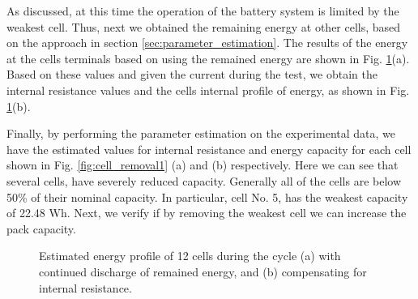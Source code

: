 \documentclass[10pt,twocolumn]{IEEEtran}
\begin{document}
As discussed, at this time the operation of the battery system is limited by the weakest cell. Thus, next we obtained the remaining energy at  other cells, based on the approach in  section \ref{sec:parameter_estimation}.
The results of the energy at the cells terminals based on using the remained energy are shown in Fig. \ref{fig:corrected_soc}(a).
Based on these values and given the current during the test,  we obtain the internal resistance values and the cells internal profile of energy, as shown in Fig. \ref{fig:corrected_soc}(b).


%


Finally, by performing  the parameter estimation on the experimental data,  we have the  estimated values for internal resistance and energy capacity for each cell shown in Fig. \ref{fig:cell_removal1} (a) and (b) respectively.
Here we can see that several cells, have severely reduced capacity. 
Generally all of the cells are below 50\%  of their nominal capacity.
In particular, cell No. 5, has the weakest capacity of 22.48 Wh. 
Next, we verify if by removing the weakest cell we can increase the pack capacity.

\begin{figure}[t]
\centering
\vspace{-0.2cm}
{} \vspace{-0.1cm}
\caption{Estimated energy profile of  12 cells during the cycle (a) with continued  discharge of remained energy, and (b) compensating for internal resistance.}
\vspace{-0.3cm}
\label{fig:corrected_soc}
\end{figure}
\end{document}
